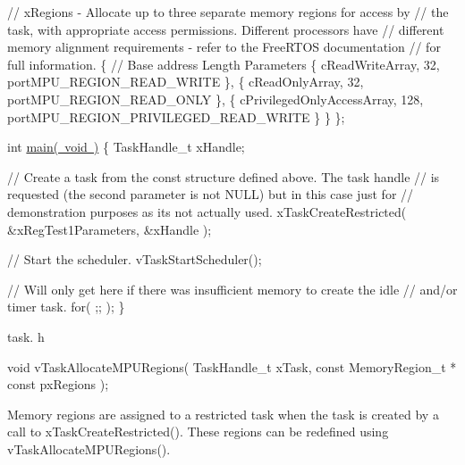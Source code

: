 \begin{DoxyPre}    // xRegions - Allocate up to three separate memory regions for access by
    // the task, with appropriate access permissions.  Different processors have
    // different memory alignment requirements - refer to the FreeRTOS documentation
    // for full information.
    \{
        // Base address                 Length  Parameters
        \{ cReadWriteArray,              32,     portMPU\_REGION\_READ\_WRITE \},
        \{ cReadOnlyArray,               32,     portMPU\_REGION\_READ\_ONLY \},
        \{ cPrivilegedOnlyAccessArray,   128,    portMPU\_REGION\_PRIVILEGED\_READ\_WRITE \}
    \}
\};\end{DoxyPre}



\begin{DoxyPre}int \mbox{\hyperlink{main_8c_a840291bc02cba5474a4cb46a9b9566fe}{main( void )}}
\{
TaskHandle\_t xHandle;\end{DoxyPre}



\begin{DoxyPre}    // Create a task from the const structure defined above.  The task handle
    // is requested (the second parameter is not NULL) but in this case just for
    // demonstration purposes as its not actually used.
    xTaskCreateRestricted( \&xRegTest1Parameters, \&xHandle );\end{DoxyPre}



\begin{DoxyPre}    // Start the scheduler.
    vTaskStartScheduler();\end{DoxyPre}



\begin{DoxyPre}    // Will only get here if there was insufficient memory to create the idle
    // and/or timer task.
    for( ;; );
\}
   \end{DoxyPre}


task. h 
\begin{DoxyPre}
 void vTaskAllocateMPURegions( TaskHandle\_t xTask, const MemoryRegion\_t * const pxRegions );\end{DoxyPre}


Memory regions are assigned to a restricted task when the task is created by a call to x\+Task\+Create\+Restricted(). These regions can be redefined using v\+Task\+Allocate\+M\+P\+U\+Regions().


